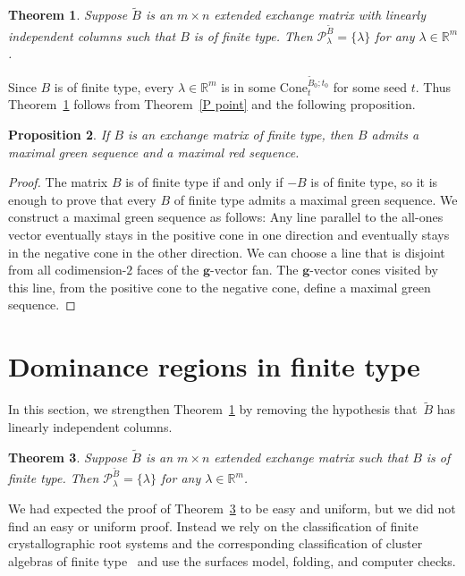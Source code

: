\documentclass{amsart}
\newtheorem{proposition}{Proposition}[section]
\newtheorem{theorem}[proposition]{Theorem}
\theoremstyle{definition}
\theoremstyle{remark}
\numberwithin{equation}{section}
\newcommand{\reals}{\mathbb R}
\newcommand{\set}[1]{{\lbrace #1 \rbrace}}
\newcommand{\0}{{\mathbf{0}}}
\newcommand{\Cone}{\mathrm{Cone}}
\newcommand{\g}{\mathbf{g}}
\newcommand{\tB}{{\widetilde{B}}}
\renewcommand{\P}{\mathcal{P}}
\begin{document}
\begin{theorem}\label{finite P point indep}  
Suppose $\tB$ is an $m\times n$ extended exchange matrix with linearly independent columns such that $B$ is of finite type.
Then $\P^\tB_\lambda=\set{\lambda}$ for any $\lambda\in\reals^m$.
\end{theorem}

Since $B$ is of finite type, every $\lambda\in\reals^m$ is in some $\Cone^{\tB_0;t_0}_t$ for some seed $t$.
Thus Theorem~\ref{finite P point indep} follows from Theorem~\ref{P point} and the following proposition.

\begin{proposition}\label{fin red}
If $B$ is an exchange matrix of finite type, then $B$ admits a maximal green sequence and a maximal red sequence.
\end{proposition}
\begin{proof}
The matrix $B$ is of finite type if and only if $-B$ is of finite type, so it is enough to prove that every $B$ of finite type admits a maximal green sequence.
We construct a maximal green sequence as follows:
Any line parallel to the all-ones vector eventually stays in the positive cone in one direction and eventually stays in the negative cone in the other direction.
We can choose a line that is disjoint from all codimension-$2$ faces of the $\g$-vector fan.
The $\g$-vector cones visited by this line, from the positive cone to the negative cone, define a maximal green sequence.
\end{proof}

\section{Dominance regions in finite type}\label{rescue sec}
In this section, we strengthen Theorem~\ref{finite P point indep} by removing the hypothesis that~$\tB$ has linearly independent columns.

\begin{theorem}\label{finite P point}  
Suppose $\tB$ is an $m\times n$ extended exchange matrix such that $B$ is of finite type.
Then $\P^\tB_\lambda=\set{\lambda}$ for any $\lambda\in\reals^m$.
\end{theorem}

We had expected the proof of Theorem~\ref{finite P point} to be easy and uniform, but we did not find an easy or uniform proof.  
Instead we rely on the classification of finite crystallographic root systems and the corresponding classification of cluster algebras of finite type~\cite{ca2} and use the surfaces model, folding, and computer checks.
\end{document}
